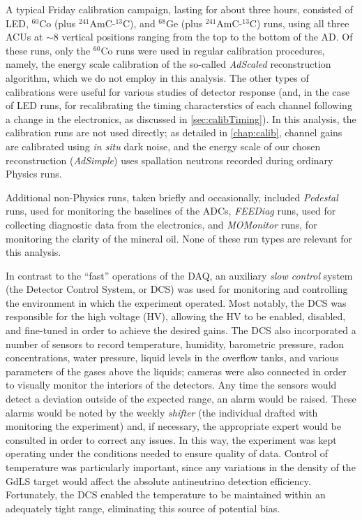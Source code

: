 \documentclass[../thesis.tex]{subfiles}
\begin{document}
A typical Friday calibration campaign, lasting for about three hours, consisted of LED, $^{60}$Co (plus $^{241}$AmC-$^{13}$C), and $^{68}$Ge (plus $^{241}$AmC-$^{13}$C) runs, using all three ACUs at $\sim$8 vertical positions ranging from the top to the bottom of the AD. Of these runs, only the $^{60}$Co runs were used in regular calibration procedures, namely, the energy scale calibration of the so-called \emph{AdScaled} reconstruction algorithm, which we do not employ in this analysis. The other types of calibrations were useful for various studies of detector response (and, in the case of LED runs, for recalibrating the timing characterstics of each channel following a change in the electronics, as discussed in \autoref{sec:calibTiming}). In this analysis, the calibration runs are not used directly; as detailed in \autoref{chap:calib}, channel gains are calibrated using \emph{in situ} dark noise, and the energy scale of our chosen reconstruction (\emph{AdSimple}) uses spallation neutrons recorded during ordinary Physics runs.

Additional non-Physics runs, taken briefly and occasionally, included \emph{Pedestal} runs, used for monitoring the baselines of the ADCs, \emph{FEEDiag} runs, used for collecting diagnostic data from the electronics, and \emph{MOMonitor} runs, for monitoring the clarity of the mineral oil. None of these run types are relevant for this analysis.

In contrast to the ``fast'' operations of the DAQ, an auxiliary \emph{slow control} system (the Detector Control System, or DCS) was used for monitoring and controlling the environment in which the experiment operated. Most notably, the DCS was responsible for the high voltage (HV), allowing the HV to be enabled, disabled, and fine-tuned in order to achieve the desired gains. The DCS also incorporated a number of sensors to record temperature, humidity, barometric pressure, radon concentrations, water pressure, liquid levels in the overflow tanks, and various parameters of the gases above the liquids; cameras were also connected in order to visually monitor the interiors of the detectors. Any time the sensors would detect a deviation outside of the expected range, an alarm would be raised. These alarms would be noted by the weekly \emph{shifter} (the individual drafted with monitoring the experiment) and, if necessary, the appropriate expert would be consulted in order to correct any issues. In this way, the experiment was kept operating under the conditions needed to ensure quality of data. Control of temperature was particularly important, since any variations in the density of the GdLS target would affect the absolute antineutrino detection efficiency. Fortunately, the DCS enabled the temperature to be maintained within an adequately tight range, eliminating this source of potential bias.

\subfilebackmatter
\end{document}
